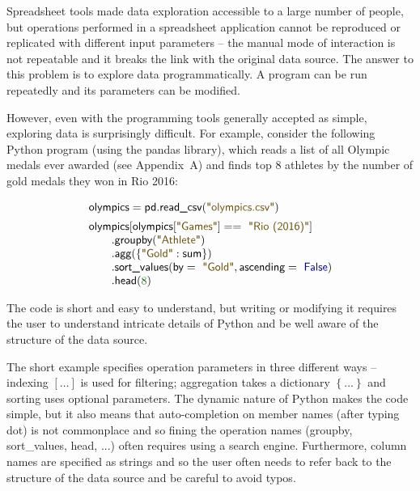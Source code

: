 \documentclass[a4paper,UKenglish]{lipics-v2016}
\newcommand{\num}[1]{\textcolor{numclr}{#1}}
\newcommand{\str}[1]{\textnormal{\textcolor{strclr}{\sffamily "#1"}}}
\newcommand{\kvd}[1]{\textnormal{\textcolor{kvdclr}{\sffamily #1}}}
\newcommand{\ident}[1]{\textnormal{\sffamily #1}}
\begin{document}
Spreadsheet tools made data exploration accessible to a large number of people, but operations 
performed in a spreadsheet application cannot be reproduced or replicated with different 
input parameters -- the manual mode of interaction is not repeatable and it breaks the link with 
the original data source. The answer to this problem is to explore data programmatically. A program 
can be run repeatedly and its parameters can be modified.

However, even with the programming tools generally accepted as simple, exploring data is 
surprisingly difficult. For example, consider the following Python program (using the pandas
library), which reads a list of all Olympic medals ever awarded (see Appendix~A) and finds top 8 
athletes by the number of gold medals they won in Rio 2016:

\noindent
\begin{equation*}
\begin{array}{l}
\ident{olympics} = \ident{pd.read\_csv}(\str{olympics.csv})\\[0.5em]
\ident{olympics}[\ident{olympics}[\str{Games}]==\str{Rio (2016)}]\\
\qquad .\ident{groupby}(\str{Athlete})\\
\qquad .\ident{agg}(\left\{\str{Gold}:\ident{sum}\right\})\\
\qquad .\ident{sort\_values}(\ident{by}=\str{Gold}, \ident{ascending}=\kvd{False})\\
\qquad .\ident{head}(\num{8})
\end{array}
\end{equation*}

\noindent
The code is short and easy to understand, but writing or modifying it requires the user to 
understand intricate details of Python and be well aware of the structure of the data source. 

The short example specifies operation parameters in three different ways -- indexing $[\ldots]$ 
is used for filtering; aggregation takes a dictionary $\left\{\ldots\right\}$ and sorting uses 
optional parameters. The dynamic nature of Python makes the code simple, but it also means that
auto-completion on member names (after typing dot) is not commonplace and so fining the operation
names (\ident{groupby}, \ident{sort\_values}, \ident{head}, ...) often requires using a search 
engine. Furthermore, column names are specified as strings and so the user often needs to refer back
to the structure of the data source and be careful to avoid typos.
\end{document}
